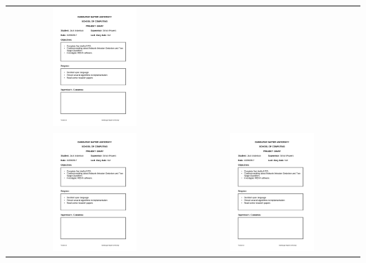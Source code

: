 \documentclass[12pt,a4paper]{article}
\begin{document}
\begin{appendices}
\begin{longtable}{@{}cc@{}}
\includegraphics[page=10, width=0.5\textwidth]{figures/diaries} \\
\includegraphics[page=11, width=0.5\textwidth]{figures/diaries} &
\includegraphics[page=12, width=0.5\textwidth]{figures/diaries} \\

\end{longtable}
\end{appendices}
\end{document}
